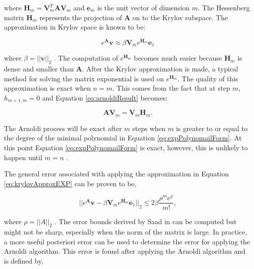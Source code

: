 \noindent where $\boldsymbol{H}_{m} = \boldsymbol{V}^{T}_{m}\boldsymbol{A}\boldsymbol{V}_{m}$ and $\boldsymbol{e}_{m}$ is the unit vector of dimension $m$. The Hessenberg matrix $\boldsymbol{H}_{m}$ represents the projection of $\boldsymbol{A}$ on to the Krylov subspace. The approximation in Krylov space is known to be: 

\begin{equation}
    e^{\boldsymbol{A}}\boldsymbol{v} \approx \beta \boldsymbol{V}_{m}e^{\boldsymbol{H}_{m}}\boldsymbol{e}_{1}
    \label{eq:krylovApproxEXP}
\end{equation}

\noindent where $\beta = ||\boldsymbol{v}||_{2}$ \cite{saad1989}. The computation of $e^{
\boldsymbol{H}_{m}}$ becomes much easier because $\boldsymbol{H}_{m}$ is dense and smaller than $\boldsymbol{A}$. After the Krylov approximation is made, a typical method for solving the matrix exponential is used on $e^{\boldsymbol{H}_{m}}$. The quality of this approximation is exact when $n = m$. This comes from the fact that at step $m$, $h_{m+1,m} = 0$ and Equation \ref{eq:arnoldiResult} becomes:

\begin{equation}
    \boldsymbol{A}\boldsymbol{V}_{m} = \boldsymbol{V}_{m}\boldsymbol{H}_{m}.
\end{equation}

\noindent The Arnoldi process will be exact after $m$ steps when $m$ is greater to or equal to the degree of the minimal polynomial in Equation \ref{eq:expPolynomailForm}. At this point Equation \ref{eq:expPolynomailForm} is exact, however, this is unlikely to happen until $m=n$ \cite{saad1992} \cite{saad1989}. 

 The general error associated with applying the approximation in Equation \ref{eq:krylovApproxEXP} can be proven to be,
 
 \begin{equation}
     ||e^{\boldsymbol{A}}\boldsymbol{v} - \beta \boldsymbol{V}_{m}e^{\boldsymbol{H}_{m}}\boldsymbol{e}_{1}||_{2} \leq 2\beta \frac{\rho^{m}e^{\rho}}{m!},
 \end{equation}
 
 \noindent where $\rho = ||A||_{2}$ \cite{saad1992}. The error bounds derived by Saad in \cite{saad1992} can be computed but might not be sharp, especially when the norm of the matrix is large. In practice, a more useful posteriori error can be used to determine the error for applying the Arnoldi algorithm. This error is found after applying the Arnoldi algorithm and is defined by,
 
